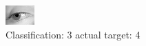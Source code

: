 \begin{figure}[h!]
\begin{center}
\includegraphics[width=0.60\columnwidth]{figures/ID2902_class_3_target_4.png}
\end{center}
\caption{ Classification: 3 actual target: 4}
\label{fig:ID2902_class_3_target_4}
\end{figure}
